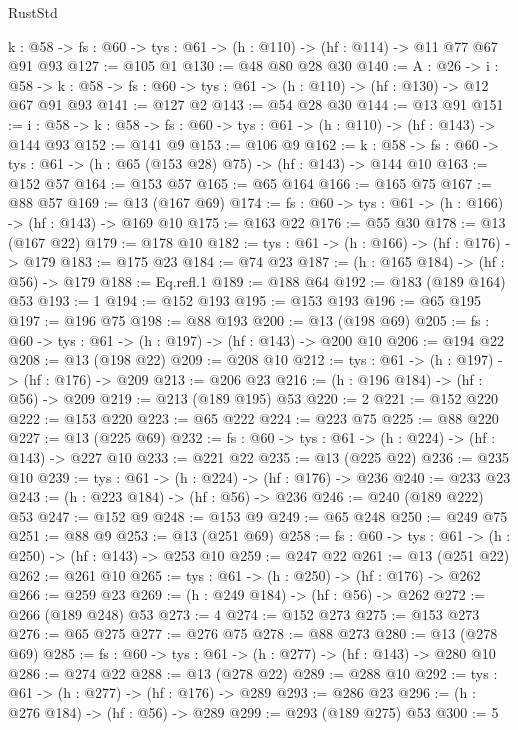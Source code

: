 \begin{lexlean}{RustStd}
\begin{coremodule}
{\begin{coremodule}
{{{{{{{{{{{{{{{{{{{{{{{{{{{  {k : @58} -> {fs : @60} -> {tys : @61} -> (h : @110) -> (hf : @114) -> @11 @77 @67 @91 @93
@127 := @105 @1
@130 := @48 @80 @28 @30
@140 := {A : @26} ->
  {i : @58} ->
  {k : @58} -> {fs : @60} -> {tys : @61} -> (h : @110) -> (hf : @130) -> @12 @67 @91 @93
@141 := @127 @2
@143 := @54 @28 @30
@144 := @13 @91
@151 := {i : @58} -> {k : @58} -> {fs : @60} -> {tys : @61} -> (h : @110) -> (hf : @143) -> @144 @93
@152 := @141 @9
@153 := @106 @9
@162 := {k : @58} ->
  {fs : @60} -> {tys : @61} -> (h : @65 (@153 @28) @75) -> (hf : @143) -> @144 @10
@163 := @152 @57
@164 := @153 @57
@165 := @65 @164
@166 := @165 @75
@167 := @88 @57
@169 := @13 (@167 @69)
@174 := {fs : @60} -> {tys : @61} -> (h : @166) -> (hf : @143) -> @169 @10
@175 := @163 @22
@176 := @55 @30
@178 := @13 (@167 @22)
@179 := @178 @10
@182 := {tys : @61} -> (h : @166) -> (hf : @176) -> @179
@183 := @175 @23
@184 := @74 @23
@187 := (h : @165 @184) -> (hf : @56) -> @179
@188 := Eq.refl.{1}
@189 := @188 @64
@192 := @183 (@189 @164) @53
@193 := 1
@194 := @152 @193
@195 := @153 @193
@196 := @65 @195
@197 := @196 @75
@198 := @88 @193
@200 := @13 (@198 @69)
@205 := {fs : @60} -> {tys : @61} -> (h : @197) -> (hf : @143) -> @200 @10
@206 := @194 @22
@208 := @13 (@198 @22)
@209 := @208 @10
@212 := {tys : @61} -> (h : @197) -> (hf : @176) -> @209
@213 := @206 @23
@216 := (h : @196 @184) -> (hf : @56) -> @209
@219 := @213 (@189 @195) @53
@220 := 2
@221 := @152 @220
@222 := @153 @220
@223 := @65 @222
@224 := @223 @75
@225 := @88 @220
@227 := @13 (@225 @69)
@232 := {fs : @60} -> {tys : @61} -> (h : @224) -> (hf : @143) -> @227 @10
@233 := @221 @22
@235 := @13 (@225 @22)
@236 := @235 @10
@239 := {tys : @61} -> (h : @224) -> (hf : @176) -> @236
@240 := @233 @23
@243 := (h : @223 @184) -> (hf : @56) -> @236
@246 := @240 (@189 @222) @53
@247 := @152 @9
@248 := @153 @9
@249 := @65 @248
@250 := @249 @75
@251 := @88 @9
@253 := @13 (@251 @69)
@258 := {fs : @60} -> {tys : @61} -> (h : @250) -> (hf : @143) -> @253 @10
@259 := @247 @22
@261 := @13 (@251 @22)
@262 := @261 @10
@265 := {tys : @61} -> (h : @250) -> (hf : @176) -> @262
@266 := @259 @23
@269 := (h : @249 @184) -> (hf : @56) -> @262
@272 := @266 (@189 @248) @53
@273 := 4
@274 := @152 @273
@275 := @153 @273
@276 := @65 @275
@277 := @276 @75
@278 := @88 @273
@280 := @13 (@278 @69)
@285 := {fs : @60} -> {tys : @61} -> (h : @277) -> (hf : @143) -> @280 @10
@286 := @274 @22
@288 := @13 (@278 @22)
@289 := @288 @10
@292 := {tys : @61} -> (h : @277) -> (hf : @176) -> @289
@293 := @286 @23
@296 := (h : @276 @184) -> (hf : @56) -> @289
@299 := @293 (@189 @275) @53
@300 := 5
}}}}}}}}}}}}}}}}}}}}}}}}}}}
\end{coremodule}}
\end{coremodule}
\end{lexlean}
